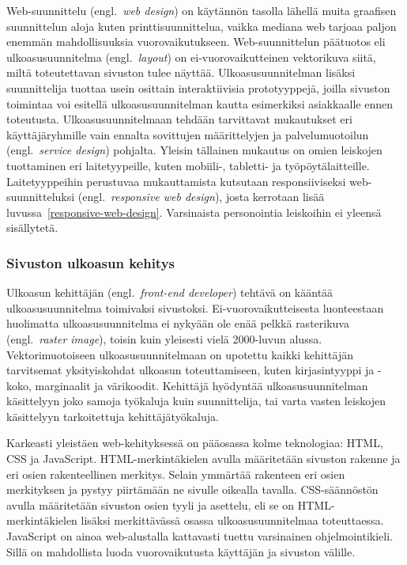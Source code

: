 \documentclass[finnish, 12pt, a4paper, elec, utf8, a-1b, online]{aaltothesis}
\begin{document}
Web-suunnittelu (engl.~\textit{web design}) on käytännön tasolla lähellä muita
graafisen suunnittelun aloja kuten printtisuunnittelua, vaikka mediana web
tarjoaa paljon enemmän mahdollisuuksia vuorovaikutukseen. Web-suunnittelun
päätuotos eli ulkoasusuunnitelma (engl.~\textit{layout}) on ei-vuorovaikutteinen
vektorikuva siitä, miltä toteutettavan sivuston tulee näyttää.
Ulkoasusuunnitelman lisäksi suunnittelija tuottaa usein osittain interaktiivisia
prototyyppejä, joilla sivuston toimintaa voi esitellä ulkoasusuunnitelman kautta
esimerkiksi asiakkaalle ennen toteutusta. Ulkoasusuunnitelmaan tehdään
tarvittavat mukautukset eri käyttäjäryhmille vain ennalta sovittujen
määrittelyjen ja palvelumuotoilun (engl.~\textit{service design}) pohjalta.
Yleisin tällainen mukautus on omien leiskojen tuottaminen eri laitetyypeille,
kuten mobiili-, tabletti- ja työpöytälaitteille. Laitetyyppeihin perustuvaa
mukauttamista kutsutaan responsiiviseksi web-suunnitteluksi
(engl.~\textit{responsive web design}), josta kerrotaan lisää
luvussa~\ref{responsive-web-design}. Varsinaista personointia leiskoihin ei
yleensä sisällytetä.

\subsubsection{Sivuston ulkoasun kehitys}

Ulkoasun kehittäjän (engl.~\textit{front-end developer}) tehtävä on kääntää
ulkoasusuunnitelma toimivaksi sivustoksi. Ei-vuorovaikutteisesta luonteestaan
huolimatta ulkoasusuunnitelma ei nykyään ole enää pelkkä rasterikuva
(engl.~\textit{raster image}), toisin kuin yleisesti vielä 2000-luvun alussa.
Vektorimuotoiseen ulkoasusuunnitelmaan on upotettu kaikki kehittäjän tarvitsemat
yksityiskohdat ulkoasun toteuttamiseen, kuten kirjasintyyppi ja -koko,
marginaalit ja värikoodit. Kehittäjä hyödyntää ulkoasusuunnitelman käsittelyyn
joko samoja työkaluja kuin suunnittelija, tai varta vasten leiskojen käsittelyyn
tarkoitettuja kehittäjätyökaluja.

Karkeasti yleistäen web-kehityksessä on pääosassa kolme teknologiaa: HTML, CSS
ja JavaScript. HTML-merkintäkielen avulla määritetään sivuston rakenne ja eri
osien rakenteellinen merkitys. Selain ymmärtää rakenteen eri osien merkityksen
ja pystyy piirtämään ne sivulle oikealla tavalla. CSS-säännöstön avulla
määritetään sivuston osien tyyli ja asettelu, eli se on HTML-merkintäkielen
lisäksi merkittävässä osassa ulkoasusuunnitelmaa toteuttaessa. JavaScript on
ainoa web-alustalla kattavasti tuettu varsinainen ohjelmointikieli. Sillä on
mahdollista luoda vuorovaikutusta käyttäjän ja sivuston välille.
\end{document}
